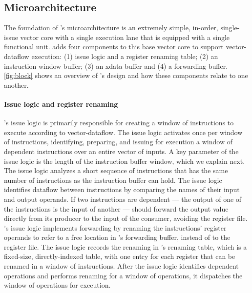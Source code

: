 \subsection{Microarchitecture}
\label{manic:manic:uarch}
The foundation of \manic's microarchitecture is an extremely simple, in-order,
single-issue vector core with a single execution lane that is equipped with a
single functional unit. 
%
\manic adds four components to this base vector core to support vector-dataflow execution: (1) issue logic and a register renaming table; (2) an
instruction window buffer; (3) an xdata buffer and (4) a forwarding buffer. 
% 
\autoref{fig:block} shows an overview of \manic's design and how these
components relate to one another.
%

\figMANICBlock

\paragraph{Issue logic and register renaming}
\manic's issue logic is primarily responsible for creating a window of
instructions to execute according to vector-dataflow.
%
The issue logic activates once per window of instructions, identifying,
preparing, and issuing for execution a window of dependent instructions over an entire vector of inputs.
%
A key parameter of the issue logic is the length of the instruction buffer
window, which we explain next.
%
The issue logic analyzes a short sequence of instructions that has the same
number of instructions as the instruction buffer can hold. 
%
The issue logic identifies dataflow between instructions by comparing the names
of their input and output operands. 
%
If two instructions are dependent --- the output of one of the instructions is 
the input of another ---  \manic should forward the output value directly from
its producer to the input of the consumer, avoiding the register file.
\manic's issue logic implements forwarding by renaming the instructions' register operands 
to refer to a free location in \manic's forwarding
buffer, instead of to the register file. 
%
The issue logic records the renaming in \manic's renaming table, which is a
fixed-size, directly-indexed table, with one entry for each register that can
be renamed in a window of instructions.
%
After the issue logic identifies dependent operations and performs renaming for
a window of operations, it dispatches the window of operations for execution.


